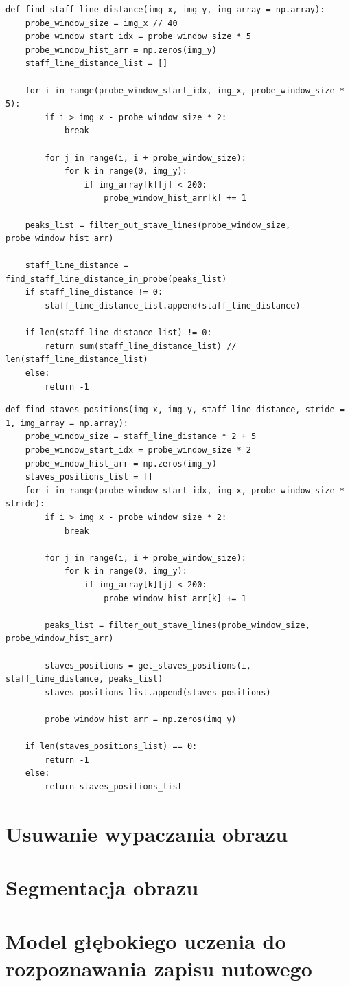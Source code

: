 \begin{lstlisting}
def find_staff_line_distance(img_x, img_y, img_array = np.array):
	probe_window_size = img_x // 40
	probe_window_start_idx = probe_window_size * 5
	probe_window_hist_arr = np.zeros(img_y)
	staff_line_distance_list = []
	
	for i in range(probe_window_start_idx, img_x, probe_window_size * 5):
		if i > img_x - probe_window_size * 2:
			break
		
		for j in range(i, i + probe_window_size):
			for k in range(0, img_y):
				if img_array[k][j] < 200:
					probe_window_hist_arr[k] += 1
	
	peaks_list = filter_out_stave_lines(probe_window_size, probe_window_hist_arr)
	
	staff_line_distance = find_staff_line_distance_in_probe(peaks_list)
	if staff_line_distance != 0:
		staff_line_distance_list.append(staff_line_distance)
	
	if len(staff_line_distance_list) != 0:
		return sum(staff_line_distance_list) // len(staff_line_distance_list)
	else:
		return -1
\end{lstlisting}


\begin{lstlisting}
def find_staves_positions(img_x, img_y, staff_line_distance, stride = 1, img_array = np.array):
	probe_window_size = staff_line_distance * 2 + 5
	probe_window_start_idx = probe_window_size * 2
	probe_window_hist_arr = np.zeros(img_y)
	staves_positions_list = []
	for i in range(probe_window_start_idx, img_x, probe_window_size * stride):
		if i > img_x - probe_window_size * 2:
			break
	
		for j in range(i, i + probe_window_size):
			for k in range(0, img_y):
				if img_array[k][j] < 200:
					probe_window_hist_arr[k] += 1
		
		peaks_list = filter_out_stave_lines(probe_window_size, probe_window_hist_arr)
		
		staves_positions = get_staves_positions(i, staff_line_distance, peaks_list)
		staves_positions_list.append(staves_positions)
		
		probe_window_hist_arr = np.zeros(img_y)
	
	if len(staves_positions_list) == 0:
		return -1
	else:
		return staves_positions_list
\end{lstlisting}


\section{Usuwanie wypaczania obrazu}

\section{Segmentacja obrazu}

\section{Model głębokiego uczenia do rozpoznawania zapisu nutowego}

